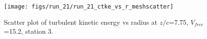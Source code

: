 \begin{figure}[H]
\centering
\texttt{[image: figs/run\_21/run\_21\_ctke\_vs\_r\_meshscatter]}
\caption{Scatter plot of turbulent kinetic energy vs radius at $z/c$=7.75, $V_{free}$=15.2, station 3.}
\label{fig:run_21_ctke_vs_r_meshscatter}
\end{figure}


